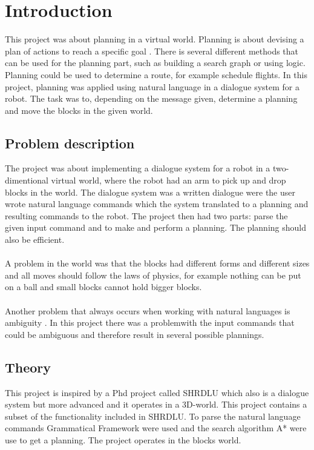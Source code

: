 \chapter{Introduction}
This project was about planning in a virtual world. Planning is about devising a plan of actions to reach a specific goal \citep{planning_ai}. There is several different methods that can be used for the planning part, such as building a search graph or using logic. 
Planning could be used to determine a route, for example schedule flights. In this project, planning was applied using natural language in a dialogue system for a robot. The task was to, depending on the message given, determine a planning and move the blocks in the given world. 

\section{Problem description}
The project was about implementing a dialogue system for a robot in a two-dimentional virtual world, where the robot had an arm to pick up and drop blocks in the world. The dialogue system was a written dialogue were the user wrote natural language commands which the system translated to a planning and resulting commands to the robot. The project then had two parts: parse the given input command and to make and perform a planning. The planning should also be efficient. \\\\
A problem in the world was that the blocks had different forms and different sizes and all moves should follow the laws of physics, for example nothing can be put on a ball and small blocks cannot hold bigger blocks. \\\\
Another problem that always occurs when working with natural languages is ambiguity \citep{naturallang_ai}. In this project there was a problemwith the input commands that could be ambiguous and therefore result in several possible plannings. 

\section{Theory}
This project is inspired by a Phd project called SHRDLU which also is a dialogue system but more advanced and it operates in a 3D-world. This project contains a subset of the functionality included in SHRDLU. To parse the natural language commands Grammatical Framework were used and the search algorithm A* were use to get a planning. The project operates in the blocks world.

